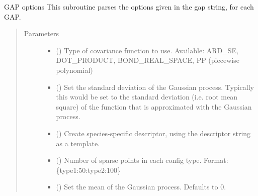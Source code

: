 \documentclass[letterpaper,10pt,english]{sphinxmanual}
\begin{document}
\begin{fulllineitems}
\label{\detokenize{descriptors:gap.descriptors.DescriptorNew}}
GAP options
This subroutine parses the options given in the gap string, for each GAP.
\begin{quote}\begin{description}
\item[{Parameters}] \leavevmode\begin{itemize}
\item {} 
 ({\hyperref[\detokenize{descriptors:gap.descriptors.covariance_type}]{}}) \textendash{} Type of covariance function to use. Available: ARD\_SE, DOT\_PRODUCT, BOND\_REAL\_SPACE, PP (piecewise polynomial)

\item {} 
 () \textendash{} Set the standard deviation of the Gaussian process. Typically this would be set to the standard deviation (i.e. root mean square) of the function that is approximated with the Gaussian process.

\item {} 
 () \textendash{} Create species-specific descriptor, using the descriptor string as a template.

\item {} 
 () \textendash{} Number of sparse points in each config type. Format: \{type1:50:type2:100\}

\item {} 
 () \textendash{} Set the mean of the Gaussian process. Defaults to 0.


\end{itemize}
\end{description}
\end{quote}
\end{fulllineitems}
\end{document}

